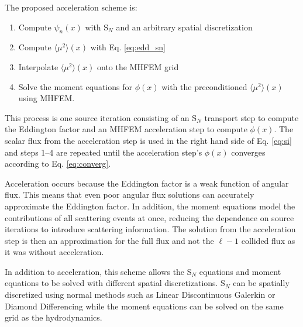 \documentclass{anstrans}
\newcommand{\SN}{S$_N$\xspace}
\newcommand{\edd}{\langle \mu^2 \rangle}
\begin{document}
	The proposed acceleration scheme is: 
		\begin{enumerate}
			\item Compute $\psi_n(x)$ with \SN and an arbitrary spatial discretization
			\item Compute $\edd(x)$ with Eq. \ref{eq:edd_sn}
			\item Interpolate $\edd(x)$ onto the MHFEM grid 
			\item Solve the moment equations for $\phi(x)$ with the preconditioned $\edd(x)$ using MHFEM. 
		\end{enumerate}
	This process is one source iteration consisting of an \SN transport step to compute the Eddington factor and an MHFEM acceleration step to compute $\phi(x)$. The scalar flux from the acceleration step is used in the right hand side of Eq. \ref{eq:si} and steps 1--4 are repeated until the acceleration step's $\phi(x)$ converges according to Eq. \ref{eq:converg}.  

	Acceleration occurs because the Eddington factor is a weak function of angular flux. This means that even poor angular flux solutions can accurately approximate the Eddington factor. In addition, the moment equations model the contributions of all scattering events at once, reducing the dependence on source iterations to introduce scattering information. The solution from the acceleration step is then an approximation for the full flux and not the $\ell - 1$ collided flux as it was without acceleration. 

	In addition to acceleration, this scheme allows the \SN equations and moment equations to be solved with different spatial discretizations. \SN can be spatially discretized using normal methods such as Linear Discontinuous Galerkin or Diamond Differencing while the moment equations can be solved on the same grid as the hydrodynamics. 

\end{document}

